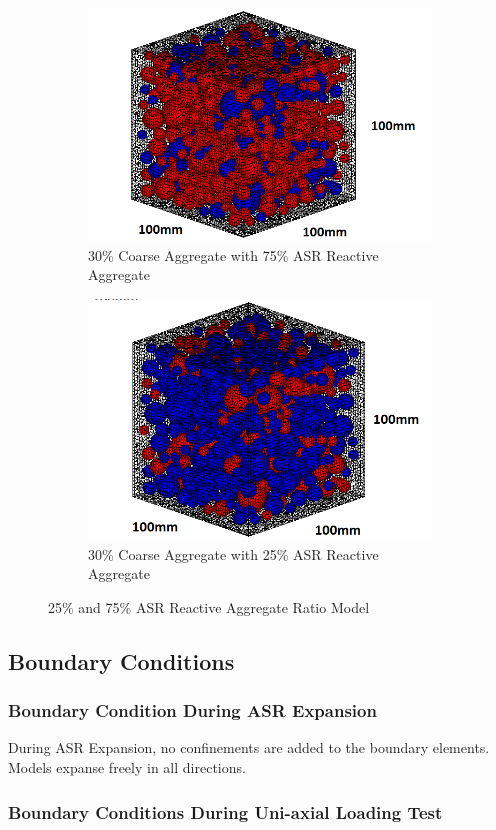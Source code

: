 \begin{figure}[!h]
\centering
\begin{subfigure}{.5\textwidth}
  \centering
  \includegraphics[width=.5\linewidth]{Files/Aggregate/A30P75.png}
  \caption{30\% Coarse Aggregate with 75\% ASR Reactive Aggregate}
\end{subfigure}%
\begin{subfigure}{.5\textwidth}
  \centering
  \includegraphics[width=.5\linewidth]{Files/Aggregate/A30P25.png}
  \caption{30\% Coarse Aggregate with 25\% ASR Reactive Aggregate}
\end{subfigure}
\caption{25\% and 75\% ASR Reactive Aggregate Ratio Model}
\label{fig:Aggregate_Percentage}
\end{figure}

\subsection{Boundary Conditions}

\subsubsection{Boundary Condition During ASR Expansion}

During ASR Expansion, no confinements are added to the boundary elements. Models expanse freely in all directions.

\subsubsection{Boundary Conditions During Uni-axial Loading Test}

